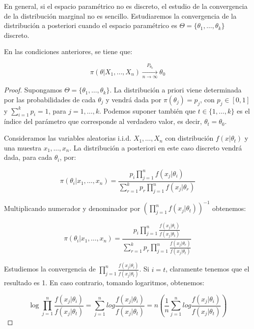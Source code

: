 \documentclass{article}
\begin{document}
En general, si el espacio paramétrico no es discreto, el estudio de la convergencia de la distribución marginal no es sencillo. Estudiaremos la convergencia de la distribución a posteriori cuando el espacio paramétrico es $\Theta = \{\theta_1,\dots,\theta_k\}$ discreto.


\begin{thm}
	En las condiciones anteriores, se tiene que:

	\[\pi(\theta|X_1,\dots,X_n) \xrightarrow[n\to\infty]{P_{\theta_0}} \theta_0\]
\end{thm}

\begin{proof}

	Supongamos $\Theta = \{\theta_1,\dots,\theta_k\}$. La distribución a priori viene determinada por las probabilidades de cada $\theta_j$ y vendrá dada por $\pi(\theta_j)=p_j$, con $p_j\in[0,1]$ y $\sum_{i=1}^{k}{p_i}=1$, para $j=1,\dots,k$. Podemos suponer también que $t\in\{1,\dots,k\}$ es el índice del parámetro que corresponde al verdadero valor, es decir, $\theta_t = \theta_0$.


	Consideramos las variables aleatorias i.i.d. $X_1,\dots,X_n$ con distribución $f(x|\theta_t)$ y una muestra $x_1,\dots,x_n$. La distribución a posteriori en este caso discreto vendrá dada, para cada $\theta_i$, por:

	\[\pi(\theta_i|x_1,\dots,x_n) = \frac{p_i \prod_{j=1}^n{f(x_j|\theta_i)}}{\sum_{r=1}^k{p_r\prod_{j=1}^n{f(x_j|\theta_r)}}}\]

	Multiplicando numerador y denominador por $\left(\prod_{j=1}^n{f(x_j|\theta_t)}\right)^{-1}$ obtenemos:

	\begin{equation} \label{eq:tcfd1}
		\pi(\theta_i|x_1,\dots,x_n) = \frac{p_i \prod_{j=1}^n{\frac{f(x_j|\theta_i)}{f(x_j|\theta_t)}}}{\sum_{r=1}^k{p_r\prod_{j=1}^n{\frac{f(x_j|\theta_r)}{f(x_j|\theta_t)}}}}
	\end{equation}


	Estudiemos la convergencia de $\prod_{j=1}^n{\frac{f(x_j|\theta_i)}{f(x_j|\theta_t)}}$. Si $i=t$, claramente tenemos que el resultado es 1. En caso contrario, tomando logaritmos, obtenemos:

	\begin{equation} \label{eq:tcfd2}
	\log{\prod_{j=1}^n{\frac{f(x_j|\theta_i)}{f(x_j|\theta_t)}}} = \sum_{j=1}^{n}{log{\frac{f(x_j|\theta_i)}{f(x_j|\theta_t)}}} = n\left(\frac{1}{n}\sum_{j=1}^{n}{log{\frac{f(x_j|\theta_i)}{f(x_j|\theta_t)}}}\right)
	\end{equation}


\end{proof}
\end{document}
